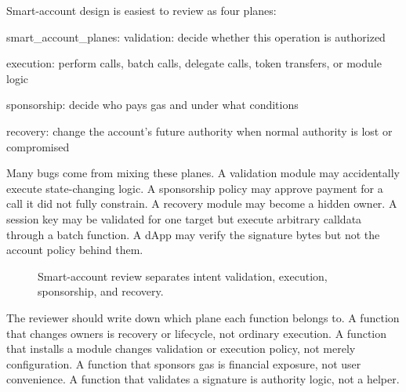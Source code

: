 Smart-account design is easiest to review as four planes:

\begin{codeblock}
smart_account_planes:
    validation:
        decide whether this operation is authorized

    execution:
        perform calls, batch calls, delegate calls, token transfers, or module logic

    sponsorship:
        decide who pays gas and under what conditions

    recovery:
        change the account's future authority when normal authority is lost or compromised
\end{codeblock}

Many bugs come from mixing these planes. A validation module may accidentally execute state-changing logic. A sponsorship policy may approve payment for a call it did not fully constrain. A recovery module may become a hidden owner. A session key may be validated for one target but execute arbitrary calldata through a batch function. A dApp may verify the signature bytes but not the account policy behind them.

\begin{figure}[htbp]
\centering
{}
\caption{Smart-account review separates intent validation, execution, sponsorship, and recovery.}
\end{figure}

The reviewer should write down which plane each function belongs to. A function that changes owners is recovery or lifecycle, not ordinary execution. A function that installs a module changes validation or execution policy, not merely configuration. A function that sponsors gas is financial exposure, not user convenience. A function that validates a signature is authority logic, not a helper.

